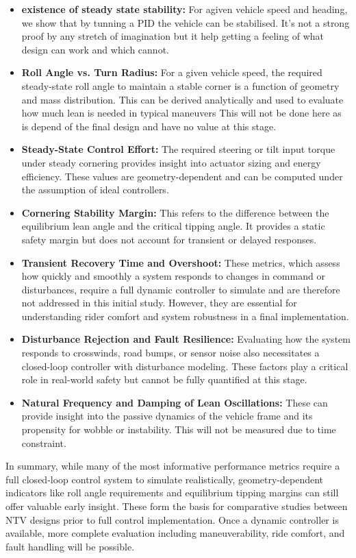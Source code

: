\begin{itemize}

    \item \textbf{existence of steady state stability:} For  agiven vehicle speed and heading, we show that by tunning a PID the vehicle can be stabilised. It's not a strong proof by any stretch of imagination but it help getting a feeling of what design can work and which cannot.

    
    \item \textbf{Roll Angle vs. Turn Radius:} For a given vehicle speed, the required steady-state roll angle to maintain a stable corner is a function of geometry and mass distribution. This can be derived analytically and used to evaluate how much lean is needed in typical maneuvers This will not be done here as is depend of the final design and have no value at this stage.
    
    \item \textbf{Steady-State Control Effort:} The required steering or tilt input torque under steady cornering provides insight into actuator sizing and energy efficiency. These values are geometry-dependent and can be computed under the assumption of ideal controllers.
    
    \item \textbf{Cornering Stability Margin:} This refers to the difference between the equilibrium lean angle and the critical tipping angle. It provides a static safety margin but does not account for transient or delayed responses.
    
    \item \textbf{Transient Recovery Time and Overshoot:} These metrics, which assess how quickly and smoothly a system responds to changes in command or disturbances, require a full dynamic controller to simulate and are therefore not addressed in this initial study. However, they are essential for understanding rider comfort and system robustness in a final implementation.
    
    \item \textbf{Disturbance Rejection and Fault Resilience:} Evaluating how the system responds to crosswinds, road bumps, or sensor noise also necessitates a closed-loop controller with disturbance modeling. These factors play a critical role in real-world safety but cannot be fully quantified at this stage.
    
    \item \textbf{Natural Frequency and Damping of Lean Oscillations:} These can provide insight into the passive dynamics of the vehicle frame and its propensity for wobble or instability. This will not be measured due to time constraint.
\end{itemize}

In summary, while many of the most informative performance metrics require a full closed-loop control system to simulate realistically, geometry-dependent indicators like roll angle requirements and equilibrium tipping margins can still offer valuable early insight. These form the basis for comparative studies between NTV designs prior to full control implementation. Once a dynamic controller is available, more complete evaluation including maneuverability, ride comfort, and fault handling will be possible.
